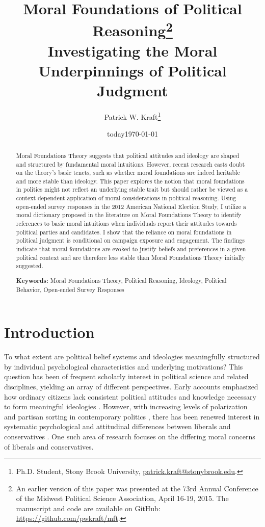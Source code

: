 \documentclass[12pt]{article}
\author{Patrick W. Kraft\footnote{Ph.D. Student, Stony Brook University, \href{mailto:patrick.kraft@stonybrook.edu}{patrick.kraft@stonybrook.edu}.
}}
\date{today}
\title{Moral Foundations of Political Reasoning\footnote{An earlier version of this paper was presented at the 73rd Annual Conference of the Midwest Political Science Association, April 16-19, 2015. The manuscript and code are available on GitHub: \url{https://github.com/pwkraft/mft}.}\\
\large{Investigating the Moral Underpinnings of Political Judgment}}
\date{\today}
\begin{document}
\maketitle
\onehalfspacing

\begin{abstract}
Moral Foundations Theory suggests that political attitudes and ideology are shaped and structured by fundamental moral intuitions. However, recent research casts doubt on the theory's basic tenets, such as whether moral foundations are indeed heritable and more stable than ideology. This paper explores the notion that moral foundations in politics might not reflect an underlying stable trait but should rather be viewed as a context dependent application of moral considerations in political reasoning. Using open-ended survey responses in the 2012 American National Election Study, I utilize a moral dictionary proposed in the literature on Moral Foundations Theory to identify references to basic moral intuitions when individuals report their attitudes towards political parties and candidates. I show that the reliance on moral foundations in political judgment is conditional on campaign exposure and engagement. The findings indicate that moral foundations are evoked to justify beliefs and preferences in a given political context and are therefore less stable than Moral Foundations Theory initially suggested.

\vspace{\baselineskip}
\noindent \textbf{Keywords:} Moral Foundations Theory, Political Reasoning, Ideology, Political Behavior, Open-ended Survey Responses
\end{abstract}
\newpage


\section{Introduction}


To what extent are political belief systems and ideologies meaningfully structured by individual psychological characteristics and underlying motivations? This question has been of frequent scholarly interest in political science and related disciplines, yielding an array of different perspectives. Early accounts emphasized how ordinary citizens lack consistent political attitudes and knowledge necessary to form meaningful ideologies \citep[e.g.][]{converse1964nature}. However, with increasing levels of polarization and partisan sorting in contemporary politics \citep{iyengar2015fear}, there has been renewed interest in systematic psychological and attitudinal differences between liberals and conservatives \citep{jost2006end}. One such area of research focuses on the differing moral concerns of liberals and conservatives.
\end{document}

